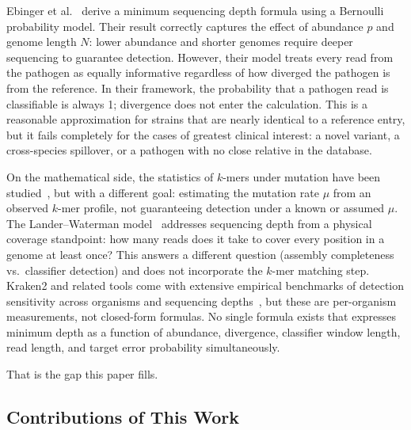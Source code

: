 \documentclass[12pt]{article}
\theoremstyle{definition}
\theoremstyle{plain}
\begin{document}
Ebinger et al.~\cite{ebinger2021} derive a minimum
sequencing depth formula using a Bernoulli probability model. Their result
correctly captures the effect of abundance $p$ and genome length $N$: lower
abundance and shorter genomes require deeper sequencing to guarantee
detection. However, their model treats every read from the pathogen as
equally informative regardless of how diverged the pathogen is from the
reference. In their framework, the probability that a pathogen read is
classifiable is always 1; divergence does not enter the calculation. This is
a reasonable approximation for strains that are nearly identical to a
reference entry, but it fails completely for the cases of greatest clinical
interest: a novel variant, a cross-species spillover, or a pathogen with no
close relative in the database.

On the mathematical side, the statistics of $k$-mers under mutation have
been studied~\cite{blanca2022,hera2023}, but with a different goal:
estimating the mutation rate $\mu$ from an observed $k$-mer profile, not
guaranteeing detection under a known or assumed $\mu$. The Lander--Waterman
model~\cite{lander1988} addresses sequencing depth from a physical coverage
standpoint: how many reads does it take to cover every position in a genome
at least once? This answers a different question (assembly completeness vs.\
classifier detection) and does not incorporate the $k$-mer matching step.
Kraken2 and related tools come with extensive empirical benchmarks of
detection sensitivity across organisms and sequencing
depths~\cite{wood2019,lu2022}, but these are per-organism measurements, not
closed-form formulas. No single formula exists that expresses minimum depth
as a function of abundance, divergence, classifier window length, read
length, and target error probability simultaneously.

That is the gap this paper fills.

\subsection{Contributions of This Work}
\end{document}
